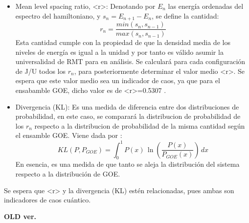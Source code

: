 \documentclass[spanish,titlepage,table]{practicas}
\begin{document}
\begin{itemize}
    \item Mean level spacing ratio, <r>: Denotando por $E_n$ las energía ordenadas del espectro del hamiltoniano, y
    $s_n=E_{n+1}-E_{n}$, se define la cantidad:
    \[
    r_n=\frac{min(s_n,s_{n-1})}{max(s_n,s_{n-1})}
    \]
    Esta cantidad cumple con la propiedad de que la densidad media de los niveles de energía es igual a la unidad
    y por tanto es válido asumir la universalidad de RMT para en análisis.
    Se calculará para cada configuración de J/U todos los $r_n$, para posteriormente determinar el valor medio <r>.
    Se espera que este valor medio sea un indicador de caos, ya que para el ensabamble GOE, dicho valor es de <r>=0.5307 \cite{Atas_2013}.
    \item Divergencia (KL): Es una medida de diferencia entre dos distribuciones de probabilidad, en este caso, se comparará la distribucion de probabilidad de los $r_n$ 
    respecto a la distribucion de probabilidad de la misma cantidad según el ensamble GOE. Viene dada por \cite{Pausch2022}:
    \[
KL(P,P_{GOE}) = \int_{0}^{1} P(x) \, \ln \left( \frac{P(x)}{P_{GOE}(x)} \right) \, dx
\]
    En esencia, es una medida de que tanto se aleja la distribución del sistema respecto a la distribución de GOE.   
\end{itemize}
Se espera que <r> y la divergencia (KL) estén relacionadas, pues ambas son indicadores de caos cuántico. 
\newline


\textbf{OLD ver.} \newline 
{}
\end{document}
